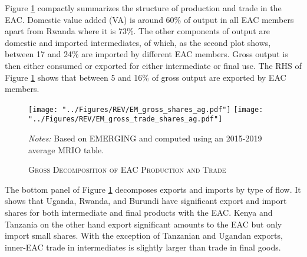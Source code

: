 \documentclass[a4paper]{article}
\begin{document}
Figure \ref{fig:shares_ag} compactly summarizes the structure of production and trade in the EAC. Domestic value added (VA) is around 60\% of output in all EAC members apart from Rwanda where it is 73\%. The other components of output are domestic and imported intermediates, of which, as the second plot shows, between 17 and 24\% are imported by different EAC members. Gross output is then either consumed or exported for either intermediate or final use. The RHS of Figure \ref{fig:shares_ag} shows that between 5 and 16\% of gross output are exported by EAC members. 
\begin{figure}[h!] \vspace{-1mm}
\centering
\caption{\label{fig:shares_ag}\textsc{Gross Decomposition of EAC Production and Trade}}
\vspace{2mm}
\texttt{[image: "../Figures/REV/EM\_gross\_shares\_ag.pdf"]} %
\texttt{[image: "../Figures/REV/EM\_gross\_trade\_shares\_ag.pdf"]} \\
\raggedright
\scriptsize
\emph{Notes:} Based on EMERGING and computed using an 2015-2019 average MRIO table. 
\end{figure}
\FloatBarrier

The bottom panel of Figure \ref{fig:shares_ag} decomposes exports and imports by type of flow. It shows that Uganda, Rwanda, and Burundi have significant export and import shares for both intermediate and final products with the EAC. Kenya and Tanzania on the other hand export significant amounts to the EAC but only import small shares. With the exception of Tanzanian and Ugandan exports, inner-EAC trade in intermediates is slightly larger than trade in final goods. \newline
\end{document}
